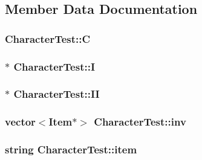\subsection{Member Data Documentation}
\hypertarget{classCharacterTest_a2afd29afdeb90cbac6ac18a71ef7e23a}{
\subsubsection[{C}]{ Character\-Test\-::\-C\hspace{0.3cm}{\ttfamily [private]}}}\label{classCharacterTest_a2afd29afdeb90cbac6ac18a71ef7e23a}
\hypertarget{classCharacterTest_a2a5e0fd6dd04bf1265ac5b1fad798a79}{
\subsubsection[{I}]{$\ast$ Character\-Test\-::\-I\hspace{0.3cm}{\ttfamily [private]}}}\label{classCharacterTest_a2a5e0fd6dd04bf1265ac5b1fad798a79}
\hypertarget{classCharacterTest_a168ed4a5b98f8048326d22f2486457a6}{
\subsubsection[{I\-I}]{$\ast$ Character\-Test\-::\-I\-I\hspace{0.3cm}{\ttfamily [private]}}}\label{classCharacterTest_a168ed4a5b98f8048326d22f2486457a6}
\hypertarget{classCharacterTest_a23af9da0d443fb16273ed269b8a91e8b}{
\subsubsection[{inv}]{\setlength{\rightskip}{0pt plus 5cm}vector$<${\bf Item}$\ast$$>$ Character\-Test\-::inv\hspace{0.3cm}{\ttfamily [private]}}}\label{classCharacterTest_a23af9da0d443fb16273ed269b8a91e8b}
\hypertarget{classCharacterTest_aee8b109b66e2f22ba5de6abaaba47160}{
\subsubsection[{item}]{\setlength{\rightskip}{0pt plus 5cm}string Character\-Test\-::item\hspace{0.3cm}{\ttfamily [private]}}}\label{classCharacterTest_aee8b109b66e2f22ba5de6abaaba47160}


